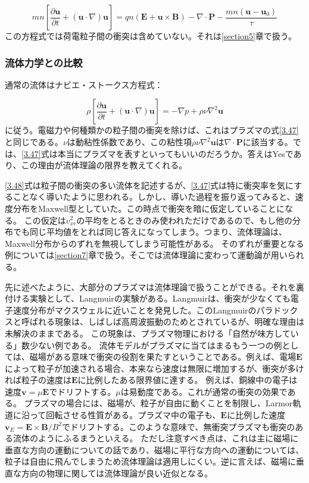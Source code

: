 \documentclass{ltjsarticle}
\numberwithin{equation}{section} %
\begin{document}
\begin{equation}
  mn\left[\frac{\partial \bm{u}}{\partial t} + (\bm{u}\cdot \nabla)\bm{u}\right] = qn(\bm{E} + \bm{u}\times \bm{B}) - \nabla \cdot \bm{P} - \frac{mn(\bm{u}-\bm{u}_0)}{\tau} \label{3.47}
\end{equation}
この方程式では荷電粒子間の衝突は含めていない。それは\ref{section5}章で扱う。


\subsubsection{流体力学との比較} \label{section3.3.4}
通常の流体はナビエ・ストークス方程式：

\begin{equation}
  \rho \left[ \frac{\partial \bm{u}}{\partial t} + (\bm{u}\cdot \nabla)\bm{u}\right] = -\nabla p + \rho \nu \nabla^2 \bm{u} \label{3.48}
\end{equation}
に従う。電磁力や何種類かの粒子間の衝突を除けば、これはプラズマの式\eqref{3.47}と同じである。$\nu$は動粘性係数であり、この粘性項$\rho \nu \nabla^2 \bm{u}$は$\nabla \cdot \bm{P}$に該当する。では、\eqref{3.47}式は本当にプラズマを表すといってもいいのだろうか。答えはYesであり、この理由が流体理論の限界を教えてくれる。

\eqref{3.48}式は粒子間の衝突の多い流体を記述するが、\eqref{3.47}式は特に衝突率を気にすることなく導いたように思われる。しかし、導いた過程を振り返ってみると、速度分布をMaxwell型としていた。この時点で衝突を暗に仮定していることになる。
この仮定は$v^2_{xr}$の平均をとるときのみ使われただけであるので、もし他の分布でも同じ平均値をとれば同じ答えになってしまう。つまり、流体理論は、Maxwell分布からのずれを無視してしまう可能性がある。
そのずれが重要となる例については\ref{section7}章で扱う。そこでは流体理論に変わって運動論が用いられる。

先に述べたように、大部分のプラズマは流体理論で扱うことができる。それを裏付ける実験として、Langmuirの実験がある。Langmuirは、衝突が少なくても電子速度分布がマクスウェルに近いことを発見した。このLangmuirのパラドックスと呼ばれる現象は、しばしば高周波振動のためとされているが、明確な理由は未解決のままである。
この現象は、プラズマ物理における「自然が味方している」数少ない例である。
流体モデルがプラズマに当てはまるもう一つの例としては、磁場がある意味で衝突の役割を果たすということである。例えば、電場$\bm{E}$によって粒子が加速される場合、本来なら速度は無限に増加するが、衝突が多ければ粒子の速度は$\bm{E}$に比例したある限界値に達する。
例えば、銅線中の電子は速度$\bm{v} = \mu \bm{E}$でドリフトする。$\mu$は易動度である。これが通常の衝突の効果である。
プラズマの場合には、磁場が、粒子が自由に動くことを制限し、Larmor軌道に沿って回転させる性質がある。プラズマ中の電子も、$\bm{E}$に比例した速度$\bm{v}_E = \bm{E}\times \bm{B}/B^2$でドリフトする。このような意味で、無衝突プラズマも衝突のある流体のようにふるまうといえる。
ただし注意すべき点は、これは主に磁場に垂直な方向の運動についての話であり、磁場に平行な方向への運動については、粒子は自由に飛んでしまうため流体理論は適用しにくい。逆に言えば、磁場に垂直な方向の物理に関しては流体理論が良い近似となる。
\end{document}
